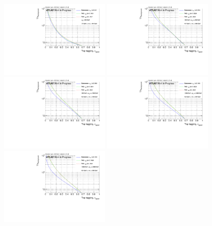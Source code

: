 \begin{figure}[H]
\includegraphics[width=0.48\textwidth]{sascha_input/Appendix/Top_best/ROC_ALL_h_recoJet_nSub32_2_bin1.pdf} \hspace{1mm}
\includegraphics[width=0.48\textwidth]{sascha_input/Appendix/Top_best/ROC_ALL_h_recoJet_nSub32_2_bin2.pdf}
\bigskip
\includegraphics[width=0.48\textwidth]{sascha_input/Appendix/Top_best/ROC_ALL_h_recoJet_nSub32_2_bin3.pdf} \hspace{1mm}
\includegraphics[width=0.48\textwidth]{sascha_input/Appendix/Top_best/ROC_ALL_h_recoJet_nSub32_2_bin4.pdf}
\bigskip
\includegraphics[width=0.48\textwidth]{sascha_input/Appendix/Top_best/ROC_ALL_h_recoJet_nSub32_2_bin5.pdf} \hspace{1mm}

\end{figure}
